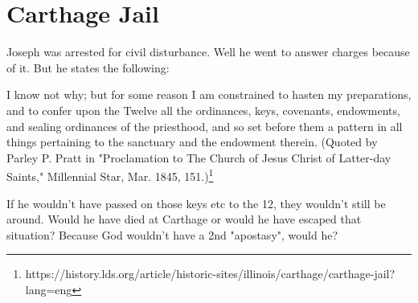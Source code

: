 \section{Carthage Jail}

Joseph was arrested for civil disturbance. Well he went to answer charges
because of it. But he states the following:
\begin{displayquote}
I know not why; but for some reason I am constrained to hasten my  preparations, 
and to confer upon the Twelve all the ordinances, keys,  covenants, endowments, 
and sealing ordinances of the priesthood, and so  set before them a pattern in 
all things pertaining to the sanctuary and  the endowment therein. (Quoted by 
Parley P. Pratt in "Proclamation to  The Church of Jesus Christ of Latter-day 
Saints," Millennial Star, Mar. 1845, 151.)\footnote{
https://history.lds.org/article/historic-sites/illinois/carthage/carthage-jail?lang=eng
}
\end{displayquote}

If he wouldn't have passed on those keys etc to the 12, they wouldn't still be 
around. Would he have died at Carthage or would he have escaped that situation? 
Because God wouldn't have a 2nd "apostasy", would he?